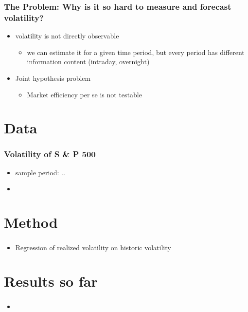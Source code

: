 \documentclass[aspectratio=169]{beamer}
\begin{document}
\begin{frame}
\frametitle{The Problem: Why is it so hard to measure and forecast volatility?}
	\begin{itemize}
	\item<1-> volatility is not directly observable
	\begin{itemize}
	\item<1-> we can estimate it for a given time period, but every period has different information content (intraday, overnight)
	\end{itemize}
	\item<2-> Joint hypothesis problem
	\begin{itemize}
	\item<2-> Market efficiency per se is not testable
	\end{itemize}
	\end{itemize}
\end{frame}

\section{Data}

\begin{frame}
\frametitle{Volatility of S \& P 500}
	\begin{itemize}
	\item sample period: ..
	\item 
	\end{itemize}
\end{frame}


\section{Method}

\begin{frame}
\frametitle{}
	\begin{itemize}
	\item Regression of realized volatility on historic volatility
	\end{itemize}
\end{frame}


\section{Results so far}

\begin{frame}
\frametitle{}
	\begin{itemize}
	\item
	\end{itemize}
\end{frame}
\end{document}
